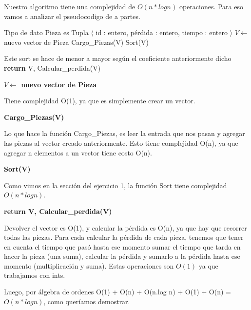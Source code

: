 Nuestro algoritmo tiene una complejidad de $O(n*log n)$ operaciones. Para eso vamos a analizar el pseudocodigo de a partes.

\begin{pseudo}
\State Tipo de dato Pieza es Tupla $\langle$ id : entero, pérdida : entero, tiempo : entero $\rangle$
        \State $V \leftarrow$ nuevo vector de Pieza 
        \State Cargo\_Piezas(V) 
        \State Sort(V) 
        
        \Comment Este sort se hace de menor a mayor según el coeficiente anteriormente dicho
        \State \textbf{return} V, Calcular\_perdida(V) 
    \EndProcedure
\end{pseudo}

\begin{pseudo}
 \State  \textbf{$V \leftarrow$ nuevo vector de Pieza}
\end{pseudo}

Tiene complejidad O(1), ya que es simplemente crear un vector.

\begin{pseudo}
 \State \textbf{Cargo\_Piezas(V)}
\end{pseudo}

Lo que hace la función Cargo\_Piezas, es leer la entrada que nos pasan y agregar las piezas al vector creado anteriormente. Esto tiene complejidad O(n), ya que agregar n elementos a un vector tiene costo O(n).

\begin{pseudo}
 \State \textbf{Sort(V)}
\end{pseudo}

Como vimos en la sección del ejercicio 1, la función Sort tiene complejidad $O(n*log n)$.

\begin{pseudo}
 \State \textbf{return V, Calcular\_perdida(V)}
\end{pseudo}

Devolver el vector es O(1), y calcular la pérdida es O(n), ya que hay que recorrer todas las piezas. Para cada calcular la pérdida de cada pieza, tenemos que tener en cuenta el tiempo que pasó hasta ese momento sumar el tiempo que tarda en hacer la pieza (una suma), calcular la pérdida y sumarlo a la pérdida hasta ese momento (multiplicación y suma). Estas operaciones son $O(1)$ ya que trabajamos con ints.

Luego, por álgebra de ordenes O(1) + O(n) + O(n.log n) + O(1) + O(n) = $O(n*log n)$, como queríamos demostrar.